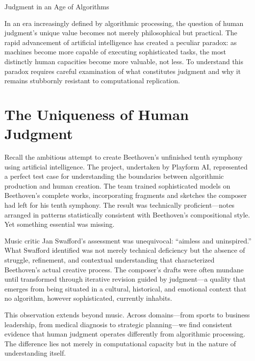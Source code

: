 \documentclass[
  Letterpaper,
]{scrbook}
\begin{document}
Judgment in an Age of Algorithms

In an era increasingly defined by algorithmic processing, the question
of human judgment's unique
value becomes not merely philosophical but practical. The rapid
advancement of artificial
intelligence has created a
peculiar paradox: as machines become more capable of executing
sophisticated tasks, the most distinctly human capacities become more
valuable, not less. To understand this paradox requires careful
examination of what constitutes judgment and why it remains stubbornly
resistant to computational replication.

\section{The Uniqueness of Human
Judgment}\label{the-uniqueness-of-human-judgment}

Recall the ambitious attempt to create Beethoven's
unfinished tenth symphony using artificial intelligence. The project,
undertaken by Playform AI, represented a perfect test case for
understanding the boundaries between algorithmic production and human
creation. The team trained sophisticated models on Beethoven's complete
works, incorporating fragments and sketches the composer had left for
his tenth symphony. The result was technically proficient---notes
arranged in patterns statistically consistent with Beethoven's
compositional style. Yet something essential was missing.

Music critic Jan Swafford's assessment was unequivocal: ``aimless and
uninspired.'' What Swafford identified was not merely technical
deficiency but the absence of struggle, refinement, and contextual
understanding that
characterized Beethoven's actual creative process. The composer's drafts
were often mundane until transformed through iterative revision guided
by judgment---a quality that emerges from being situated in a cultural,
historical, and emotional context that no algorithm, however
sophisticated, currently inhabits.

This observation extends beyond music. Across domains---from sports to
business leadership, from medical diagnosis to
strategic planning---we find consistent evidence that human judgment
operates differently from algorithmic processing. The difference lies
not merely in computational capacity but in the nature of understanding
itself.
\end{document}
